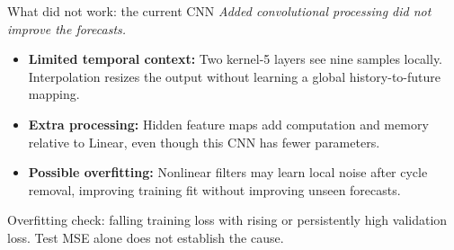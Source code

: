 \documentclass[aspectratio=169]{beamer}
\begin{document}
\begin{frame}{What did not work: the current CNN}
\small
\textit{Added convolutional processing did not improve the forecasts.}\par
\vspace{0.55em}
{\setlength{\fboxsep}{7pt}\setlength{\fboxrule}{0.45pt}%
\noindent\color{black}}
\vspace{0.75em}
\begin{itemize}
  \setlength{\itemsep}{0.55em}
  \item \textbf{Limited temporal context:} Two kernel-5 layers see nine samples locally. Interpolation resizes the output without learning a global history-to-future mapping.
  \item \textbf{Extra processing:} Hidden feature maps add computation and memory relative to Linear, even though this CNN has fewer parameters.
  \item \textbf{Possible overfitting:} Nonlinear filters may learn local noise after cycle removal, improving training fit without improving unseen forecasts.
\end{itemize}
\vspace{0.35em}
{\footnotesize\textcolor{muted}{Overfitting check: falling training loss with rising or persistently high validation loss. Test MSE alone does not establish the cause.}}
\end{frame}
\end{document}
